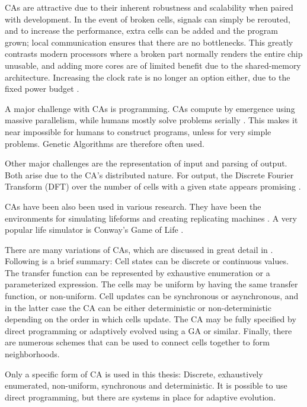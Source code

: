 CAs are attractive due to their inherent robustness and scalability when paired with development.
In the event of broken cells, signals can simply be rerouted, and to increase the performance, extra cells can be added and the program grown; local communication ensures that there are no bottlenecks.
This greatly contrasts modern processors where a broken part normally renders the entire chip unusable, and adding more cores are of limited benefit due to the shared-memory architecture.
Increasing the clock rate is no longer an option either, due to the fixed power budget .

A major challenge with CAs is programming.
CAs compute by emergence using massive parallelism, while humans mostly solve problems serially \cite{newell1972problemsolving}.
This makes it near impossible for humans to construct programs, unless for very simple problems.
Genetic Algorithms are therefore often used.

Other major challenges are the representation of input and parsing of output.
Both arise due to the CA's distributed nature.
For output, the Discrete Fourier Transform (DFT) over the number of cells with a given state appears promising \cite{berg2013ca}.

CAs have been also been used in various research.
They have been the environments for simulating lifeforms and creating replicating machines \cite{neumann1966selfreplication}.
A very popular life simulator is Conway's Game of Life \cite{gardner1970life}.

There are many variations of CAs, which are discussed in great detail in \cite{sipper1999emergence}.
Following is a brief summary:
Cell states can be discrete or continuous values.
The transfer function can be represented by exhaustive enumeration or a parameterized expression.
The cells may be uniform by having the same transfer function, or non-uniform.
Cell updates can be synchronous or asynchronous, and in the latter case the CA can be either deterministic or non-deterministic depending on the order in which cells update.
The CA may be fully specified by direct programming or adaptively evolved using a GA or similar.
Finally, there are numerous schemes that can be used to connect cells together to form neighborhoods.

Only a specific form of CA is used in this thesis:
Discrete, exhaustively enumerated, non-uniform, synchronous and deterministic.
It is possible to use direct programming, but there are systems in place for adaptive evolution.

